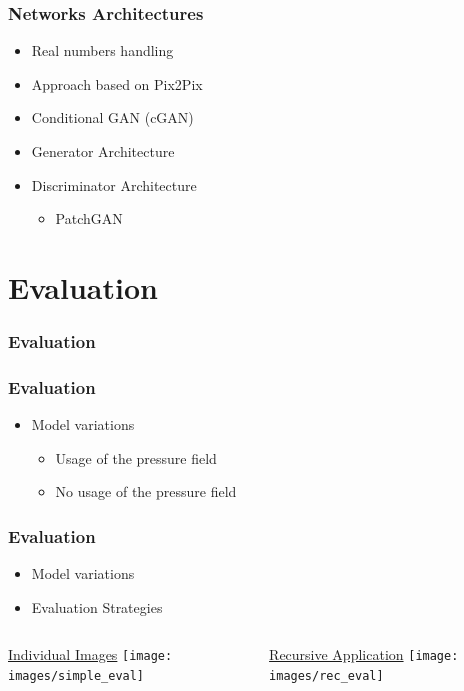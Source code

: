 \documentclass[18pt, xcolor=table]{beamer}
\begin{document}
\begin{frame}[t]
  \frametitle{Networks Architectures}
  \begin{itemize}
  \item Real numbers handling
  \item Approach based on Pix2Pix
  \item Conditional GAN (cGAN)
  \item Generator Architecture
  \item Discriminator Architecture
    \begin{itemize}
    \item PatchGAN
    \end{itemize}
  \end{itemize}

\end{frame}

\section{Evaluation}

\begin{frame}[t]
  \frametitle{Evaluation}
\end{frame}

\begin{frame}[t]
  \frametitle{Evaluation}
  \begin{itemize}
  \item Model variations
    \begin{itemize}
    \item Usage of the pressure field
    \item No usage of the pressure field
    \end{itemize}
  \end{itemize}
\end{frame}

\begin{frame}[t]
  \frametitle{Evaluation}
  \begin{itemize}
  \item Model variations
  \item Evaluation Strategies
  \end{itemize}
  \vspace{-0.7cm}
  \begin{columns}[t]
    \begin{column}{0.5\textwidth}
      \begin{center}
        {\large \underline{Individual Images}}
        \texttt{[image: images/simple\_eval]}
      \end{center}
    \end{column}
    \begin{column}{0.5\textwidth}
      \begin{center}
        {\large \underline{Recursive Application}}
        \texttt{[image: images/rec\_eval]}
      \end{center}
    \end{column}
  \end{columns}
\end{frame}
\end{document}
